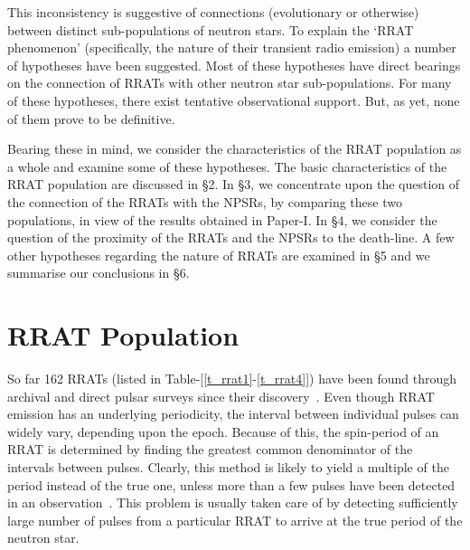 \documentclass{jaa}
\begin{document}
This  inconsistency  is  suggestive of  connections  (evolutionary  or
otherwise)  between distinct  sub-populations  of  neutron stars.   To
explain  the  `RRAT phenomenon'  (specifically,  the  nature of  their
transient radio emission) a number  of hypotheses have been suggested.
Most of  these hypotheses  have direct bearings  on the  connection of
RRATs  with other  neutron  star sub-populations.  For  many of  these
hypotheses, there exist tentative  observational support. But, as yet,
none of them prove to be definitive.

Bearing these  in mind,  we consider the  characteristics of  the RRAT
population as a whole and examine some of these hypotheses.  The basic
characteristics of  the RRAT population  are discussed in \S2.
In
\S3, we concentrate  upon the question of the connection  of the RRATs
with the  NPSRs, by comparing  these two  populations, in view  of the
results obtained in  Paper-I. In \S4, we consider the  question of the
proximity of the  RRATs and the NPSRs to the  death-line.  A few other
hypotheses regarding  the nature of RRATs  are examined in \S5  and we
summarise our conclusions in \S6.

\section{RRAT Population}
% 
So far 162 RRATs  (listed in Table-[\ref{t_rrat1}-\ref{t_rrat4}]) have
been  found through  archival and  direct pulsar  surveys since  their
discovery~\cite{mclau06}.  Even though RRAT emission has an underlying
periodicity, the  interval between individual pulses  can widely vary,
depending upon the epoch.  Because of this, the spin-period of an RRAT
is  determined  by finding  the  greatest  common denominator  of  the
intervals between  pulses. Clearly, this  method is likely to  yield a
multiple of  the period instead of  the true one, unless  more than a
few pulses  have been  detected in an  observation~\cite{cui17}.  This
problem  is usually  taken  care of  by  detecting sufficiently  large
number of pulses  from a particular RRAT to arrive  at the true period
of the neutron star.
\end{document}
